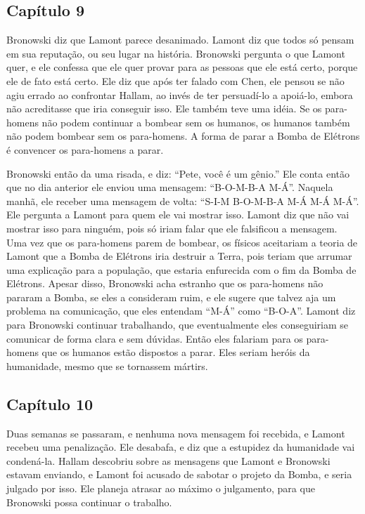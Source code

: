 \documentclass[14pt,portuguese]{extreport}
\begin{document}
      \subsection{Capítulo 9}

    	  Bronowski diz que Lamont parece desanimado. Lamont diz que todos só pensam em sua reputação, ou seu lugar na história. Bronowski pergunta o que Lamont quer, e ele confessa que ele quer provar para as pessoas que ele está certo, porque ele de fato está certo. Ele diz que após ter falado com Chen, ele pensou se não agiu errado ao confrontar Hallam, ao invés de ter persuadí-lo a apoiá-lo, embora não acreditasse que iria conseguir isso. Ele também teve uma idéia. Se os para-homens não podem continuar a bombear sem os humanos, os humanos também não podem bombear sem os para-homens. A forma de parar a Bomba de Elétrons é convencer os para-homens a parar.
	  
    	  Bronowski então da uma risada, e diz: “Pete, você é um gênio.” Ele conta então que no dia anterior ele enviou uma mensagem: “B-O-M-B-A M-Á”. Naquela manhã, ele receber uma mensagem de volta: “S-I-M B-O-M-B-A M-Á M-Á M-Á”. Ele pergunta a Lamont para quem ele vai mostrar isso. Lamont diz que não vai mostrar isso para ninguém, pois só iriam falar que ele falsificou a mensagem. Uma vez que os para-homens parem de bombear, os físicos aceitariam a teoria de Lamont que a Bomba de Elétrons iria destruir a Terra, pois teriam que arrumar uma explicação para a população, que estaria enfurecida com o fim da Bomba de Elétrons. Apesar disso, Bronowski acha estranho que os para-homens não pararam a Bomba, se eles a consideram ruim, e ele sugere que talvez aja um problema na comunicação, que eles entendam “M-Á” como “B-O-A”. Lamont diz para Bronowski continuar trabalhando, que eventualmente eles conseguiriam se comunicar de forma clara e sem dúvidas. Então eles falariam para os para-homens que os humanos estão dispostos a parar. Eles seriam heróis da humanidade, mesmo que se tornassem mártirs.

    	\subsection{Capítulo 10}

    	  Duas semanas se passaram, e nenhuma nova mensagem foi recebida, e Lamont recebeu uma penalização. Ele desabafa, e diz que a estupidez da humanidade vai condená-la. Hallam descobriu sobre as mensagens que Lamont e Bronowski estavam enviando, e Lamont foi acusado de sabotar o projeto da Bomba, e seria julgado por isso. Ele planeja atrasar ao máximo o julgamento, para que Bronowski possa continuar o trabalho.
    	
\end{document}

